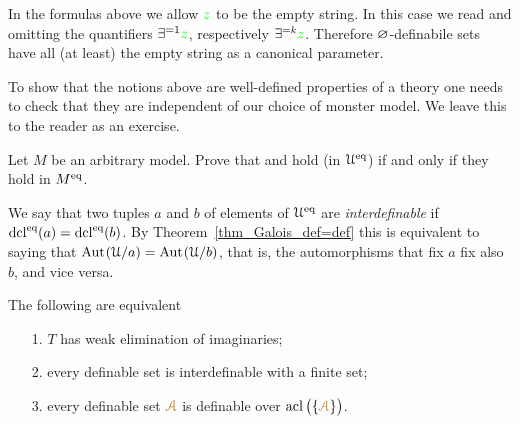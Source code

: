 \documentclass[creche.tex]{subfiles}
\begin{document}
In the formulas above we allow ${\color{green} z}$ to be the empty string.
In this case we read  and  omitting the quantifiers $\exists^{=1}{\color{green} z}$, respectively $\exists^{=k}{\color{green} z}$.
Therefore $\varnothing$-definabile sets have all (at least) the empty string as a canonical parameter.

To show that the notions above are well-defined properties of a theory one needs to check that they are independent of our choice of monster model.
We leave this to the reader as an exercise.

\begin{exercise}
Let $M$ be an arbitrary model.
Prove that  and  hold (in $\EuScript U^{{\rm eq}}$) if and only if they hold in $M^{{\rm eq}}$.\QED
\end{exercise}

We say that two tuples $a$ and $b$ of elements of $\EuScript U^{{\rm eq}}$ are \emph{interdefinable\/} if $\mathop{\rm dcl}^{{\rm eq}}(a)=\mathop{\rm dcl}^{{\rm eq}}(b)$.
By Theorem~\ref{thm_Galois_def=def} this is equivalent to saying that $\textrm{Aut\kern.15ex}(\EuScript U/a)=\textrm{Aut\kern.15ex}(\EuScript U/b)$, that is, the automorphisms that fix $a$ fix also $b$, and vice versa.

\begin{theorem}\label{elimimd}
The following are equivalent
\begin{itemize}
\item[1.] $T$ has weak elimination of imaginaries;
\item[2.] every definable set is interdefinable with a finite set;
\item[3.] every definable set ${\color{brown}\EuScript A}$ is definable over $\mathop{\rm acl}\big(\{{\color{brown}\EuScript A}\}\big)$.
\end{itemize}
\end{theorem}
\end{document}
